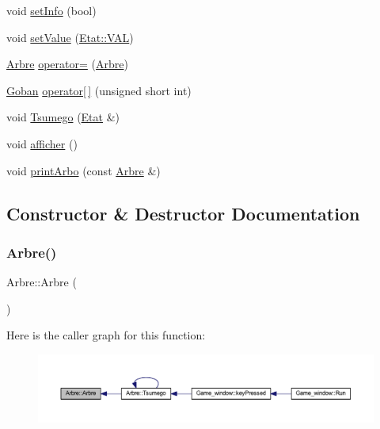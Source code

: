 \begin{DoxyCompactItemize}
void \hyperlink{class_arbre_a051e5328c63ba7ab6f6359f9f2f77105}{set\+Info} (bool)
\item 
void \hyperlink{class_arbre_a8108ffdff578e323dd9e50cc105a5c04}{set\+Value} (\hyperlink{class_etat_af3ddb2296ffc379b7f3ad2bf832f294e}{Etat\+::\+V\+AL})
\item 
\hyperlink{class_arbre}{Arbre} \hyperlink{class_arbre_a2a919273c1041a7f024f717cdd638632}{operator=} (\hyperlink{class_arbre}{Arbre})
\item 
\hyperlink{class_goban}{Goban} \hyperlink{class_arbre_a8127785309368d2f2cd5a68f913e18cd}{operator\mbox{[}$\,$\mbox{]}} (unsigned short int)
\item 
void \hyperlink{class_arbre_acd12cae4820bb7780a628716a0615d10}{Tsumego} (\hyperlink{class_etat}{Etat} \&)
\item 
void \hyperlink{class_arbre_a970de955ffdbbd5894e0fa0c40c4e69e}{afficher} ()
\item 
void \hyperlink{class_arbre_ac6329911b0037ca669e6ef2e12a178c9}{print\+Arbo} (const \hyperlink{class_arbre}{Arbre} \&)
\end{DoxyCompactItemize}


\subsection{Constructor \& Destructor Documentation}
\mbox{\label{class_arbre_a761f4a2c6a43f44b38d4ac6fc1cf5cae}} 
\subsubsection{\texorpdfstring{Arbre()}{Arbre()}\hspace{0.1cm}{\footnotesize\ttfamily [1/5]}}
{\footnotesize\ttfamily Arbre\+::\+Arbre (\begin{DoxyParamCaption}{ }\end{DoxyParamCaption})}

Here is the caller graph for this function\+:\nopagebreak
\begin{figure}[H]
\begin{center}
\leavevmode
\includegraphics[width=350pt]{class_arbre_a761f4a2c6a43f44b38d4ac6fc1cf5cae_icgraph}
\end{center}
\end{figure}
\mbox{\label{class_arbre_a3284c47c1ea92a6c5be4a210008dfb4f}} 
